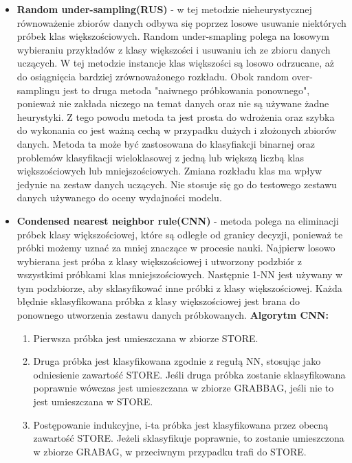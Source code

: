 \documentclass{article}
\begin{document}
\begin{itemize}
    \item \textbf{Random under-sampling(RUS)} - w tej metodzie nieheurystycznej równoważenie zbiorów danych odbywa się poprzez losowe usuwanie niektórych próbek klas większościowych. Random under-smapling polega na losowym wybieraniu przykładów z klasy większości i usuwaniu ich ze zbioru danych uczących. W tej metodzie instancje klas większości są losowo odrzucane, aż do osiągnięcia bardziej zrównoważonego rozkładu. Obok random over-samplingu jest to druga metoda "naiwnego próbkowania ponownego", ponieważ nie zakłada niczego na temat danych oraz nie są używane żadne heurystyki. Z tego powodu metoda ta jest prosta do wdrożenia oraz szybka do wykonania co jest ważną cechą w przypadku dużych i złożonych zbiorów danych. Metoda ta może być zastosowana do klasyfiakcji binarnej oraz problemów klasyfikacji wieloklasowej z jedną lub większą liczbą klas większościowych lub mniejszościowych. Zmiana rozkładu klas ma wpływ jedynie na zestaw danych uczących. Nie stosuje się go do testowego zestawu danych używanego do oceny wydajności modelu.
    \newline
    \item \textbf{Condensed nearest neighbor rule(CNN)} - metoda polega na eliminacji próbek klasy większościowej, które są odległe od granicy decyzji, ponieważ te próbki możemy uznać za mniej znaczące w procesie nauki. Najpierw losowo wybierana jest próba z klasy większościowej i utworzony podzbiór z wszystkimi próbkami klas mniejszościowych. Następnie 1-NN jest używany w tym podzbiorze, aby sklasyfikować inne próbki z klasy większościowej. Każda błędnie sklasyfikowana próbka z klasy większościowej jest brana do ponownego utworzenia zestawu danych próbkowanych. 
    \break
    \newline
    \textbf{Algorytm CNN\cite{hart1968condensed}:}
    \begin{enumerate}
        \item  Pierwsza próbka jest umieszczana w zbiorze STORE.
        
        \item  Druga próbka jest klasyfikowana zgodnie z regułą NN, stosując jako odniesienie zawartość STORE. Jeśli druga próbka zostanie sklasyfikowana poprawnie wówczas jest umieszczana w zbiorze GRABBAG, jeśli nie to jest umieszczana w STORE.
        
        \item  Postępowanie indukcyjne, i-ta próbka jest klasyfikowana przez obecną zawartość STORE. Jeżeli sklasyfikuje poprawnie, to zostanie umieszczona w zbiorze GRABAG, w przeciwnym przypadku trafi do STORE.
        

\end{enumerate}
\end{itemize}
\end{document}
